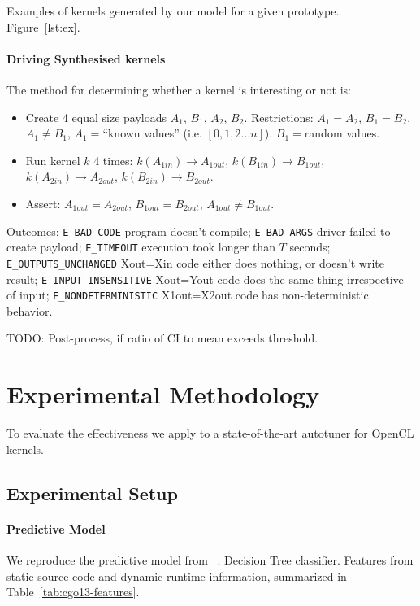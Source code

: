 \documentclass[preprint,nonatbib,10pt,nocopyrightspace]{sigplanconf}
\begin{document}
Examples of kernels generated by our model for a given
prototype. Figure~\ref{lst:ex}.


\paragraph{Driving Synthesised kernels}

The method for determining whether a kernel is interesting or not is:

\begin{itemize}
\item Create 4 equal size payloads $A_1$, $B_1$, $A_2$, $B_2$.
  Restrictions: $A_1=A_2$, $B_1=B_2$, $A_1 \ne B_1$, $A_1 =$“known
  values” (i.e. $\left[0, 1, 2 \ldots n\right]$). $B_1=$random values.
\item Run kernel $k$ 4 times: $k(A_{1in}) \rightarrow A_{1out}$,
  $k(B_{1in}) \rightarrow B_{1out}$,
  $k(A_{2in}) \rightarrow A_{2out}$,
  $k(B_{2in}) \rightarrow B_{2out}$.
\item Assert: $A_{1out}=A_{2out}$, $B_{1out}=B_{2out}$,
  $A_{1out} \ne B_{1out}$.
\end{itemize}

Outcomes: \texttt{E\_BAD\_CODE} program doesn’t compile;
\texttt{E\_BAD\_ARGS} driver failed to create payload;
\texttt{E\_TIMEOUT} execution took longer than $T$ seconds;
\texttt{E\_OUTPUTS\_UNCHANGED} Xout=Xin code either does nothing, or
doesn’t write result; \texttt{E\_INPUT\_INSENSITIVE} Xout=Yout code
does the same thing irrespective of input;
\texttt{E\_NONDETERMINISTIC} X1out=X2out code has non-deterministic
behavior.


TODO: Post-process, if ratio of CI to mean exceeds threshold.


\section{Experimental Methodology}\label{sec:evaluation}

To evaluate the effectiveness we apply to a state-of-the-art autotuner
for OpenCL kernels.

\subsection{Experimental Setup}\label{subsec:}

\paragraph{Predictive Model} We reproduce the predictive model from
\citeauthor{Grewe2013}~\cite{Grewe2013}. Decision Tree
classifier. Features from static source code and dynamic runtime
information, summarized in Table~\ref{tab:cgo13-features}.
\end{document}
